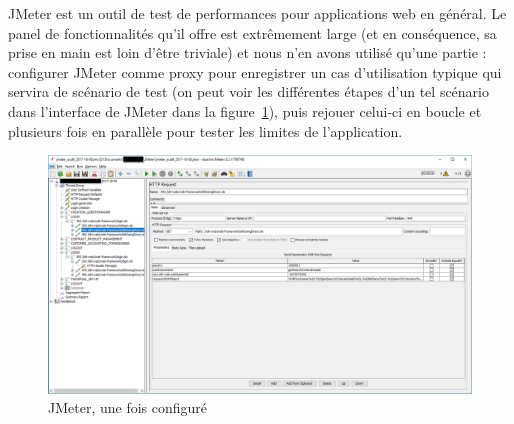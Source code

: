 JMeter est un outil de test de performances pour applications web en général. Le panel de fonctionnalités qu'il offre est extrêmement large (et en conséquence, sa prise en main est loin d'être triviale) et nous n'en avons utilisé qu'une partie : configurer JMeter comme proxy pour enregistrer un cas d'utilisation typique qui servira de scénario de test (on peut voir les différentes étapes d'un tel scénario dans l'interface de JMeter dans la figure~\ref{fig:jmeter}), puis rejouer celui-ci en boucle et plusieurs fois en parallèle pour tester les limites de l'application.
\begin{figure}
  \includegraphics[width=\linewidth]{images/jmeter}
  \caption{JMeter, une fois configuré}
  \label{fig:jmeter}
\end{figure}

